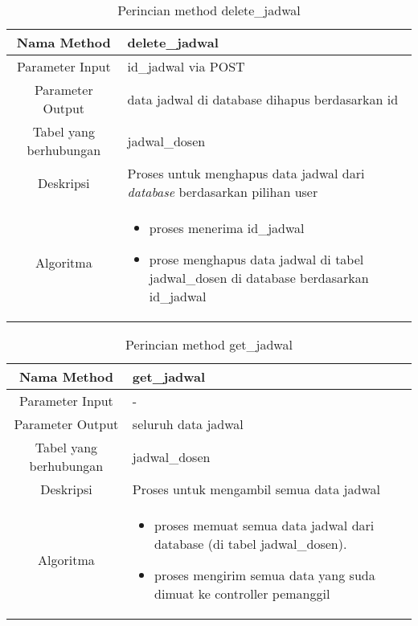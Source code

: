\begin{center}
\begin{table}[H]
\caption{Perincian method delete\_jadwal}
\begin{tabular}{|c|p{11cm}|}
\hline
Nama Method 	& 	delete\_jadwal 	\\
\hline
Parameter Input & id\_jadwal via POST \\
\hline
Parameter Output & data jadwal di database dihapus berdasarkan id \\
\hline
Tabel yang berhubungan & jadwal\_dosen \\
\hline
Deskripsi	& Proses untuk menghapus data jadwal dari \textit{database} berdasarkan pilihan user \\
\hline
Algoritma	& \begin{itemize}
				\item proses menerima id\_jadwal
				\item prose menghapus data jadwal di tabel jadwal\_dosen di database berdasarkan id\_jadwal
				\end{itemize} \\
\hline
\end{tabular}
\end{table}
\end{center}


\begin{center}
\begin{table}[H]
\caption{Perincian method get\_jadwal}
\begin{tabular}{|c|p{11cm}|}
\hline
Nama Method 	& 	get\_jadwal 	\\
\hline
Parameter Input &  - \\
\hline
Parameter Output & seluruh data jadwal \\
\hline
Tabel yang berhubungan & jadwal\_dosen \\
\hline
Deskripsi	& Proses untuk mengambil semua data jadwal \\
\hline
Algoritma	& \begin{itemize}
				\item proses memuat semua data jadwal dari database (di tabel jadwal\_dosen).
				\item proses mengirim semua data yang suda dimuat ke controller pemanggil
				\end{itemize} \\
\hline
\end{tabular}
\end{table}
\end{center}


